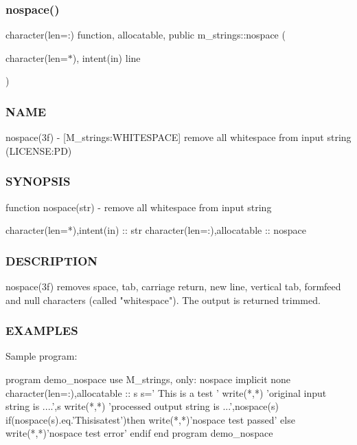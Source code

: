 \subsubsection{\texorpdfstring{nospace()}{nospace()}}
{\footnotesize\ttfamily character(len=\+:) function, allocatable, public m\+\_\+strings\+::nospace (\begin{DoxyParamCaption}\item[{character(len=$\ast$), intent(in)}]{line }\end{DoxyParamCaption})}



\subsubsection*{N\+A\+ME}

nospace(3f) -\/ \mbox{[}M\+\_\+strings\+:W\+H\+I\+T\+E\+S\+P\+A\+CE\mbox{]} remove all whitespace from input string (L\+I\+C\+E\+N\+SE\+:PD) 

\subsubsection*{S\+Y\+N\+O\+P\+S\+IS}

\begin{DoxyVerb}function nospace(str) - remove all whitespace from input string

 character(len=*),intent(in)          :: str
 character(len=:),allocatable         :: nospace
\end{DoxyVerb}
 \subsubsection*{D\+E\+S\+C\+R\+I\+P\+T\+I\+ON}

\begin{DoxyVerb}nospace(3f) removes space, tab, carriage return, new line, vertical
tab, formfeed and null characters (called "whitespace"). The output
is returned trimmed.
\end{DoxyVerb}


\subsubsection*{E\+X\+A\+M\+P\+L\+ES}

Sample program\+: \begin{DoxyVerb} program demo_nospace
 use M_strings, only: nospace
 implicit none
 character(len=:),allocatable  :: s
    s='  This     is      a     test  '
    write(*,*) 'original input string is ....',s
    write(*,*) 'processed output string is ...',nospace(s)
    if(nospace(s).eq.'Thisisatest')then
       write(*,*)'nospace test passed'
    else
       write(*,*)'nospace test error'
    endif
 end program demo_nospace
\end{DoxyVerb}



